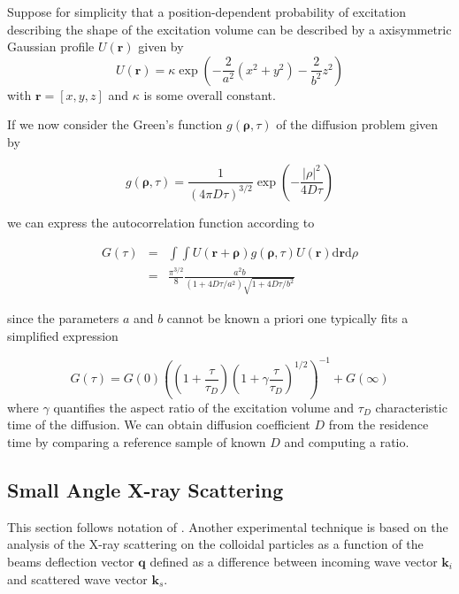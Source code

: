 \documentclass{doctoral}
\newcommand{\dd}{\mathrm{d}}
\begin{document}
Suppose for simplicity that a position-dependent probability of excitation describing the shape of the excitation volume can be described by a axisymmetric Gaussian profile $U(\mathbf{r})$ given by
\begin{equation}
    U(\mathbf{r}) = \kappa \exp\left( - \frac{2}{a^2} \left( x^2 + y^2 \right) - \frac{2}{b^2} z^2 \right) \label{eqn:excitation_profile}
\end{equation}
with $\mathbf{r} = [x,y,z]$ and $\kappa$ is some overall constant.

If we now consider the Green's function $g(\mathbf{\rho},\tau)$ of the diffusion problem given by 

\begin{equation}
    g(\mathbf{\rho},\tau) = \frac{1}{(4\pi D \tau)^{3/2}} \exp\left( - \frac{|\rho|^2}{4 D \tau}\right)
\end{equation}

we can express the autocorrelation function according to 

\begin{eqnarray}
    G(\tau) & = & \int \int U(\mathbf{r} + \mathbf{\rho}) g(\mathbf{\rho},\tau) U(\mathbf{r}) \dd \mathbf{r} \dd \rho \\
            & = & \frac{\pi^{3/2}}{8} \frac{a^2 b}{(1+4 D \tau / a^2)\sqrt{1+4D\tau/b^2}} \label{eqn:fcs_theory}
\end{eqnarray}

since the parameters $a$ and $b$ cannot be known a priori one typically fits a simplified expression 

\begin{equation}
    G(\tau) = G(0) \left( \left(1+\frac{\tau}{\tau_D}\right) \left(1 + \gamma \frac{\tau}{\tau_D}\right)^{1/2} \right)^{-1} + G(\infty) \label{eqn:fcs-autocorrelation}
\end{equation}
where $\gamma$ quantifies the aspect ratio of the excitation volume and $\tau_D$ characteristic time of the diffusion.
We can obtain diffusion coefficient $D$ from the residence time by comparing a reference sample of known $D$ and computing a ratio.

\subsection{Small Angle X-ray Scattering}
\label{sec:SAXS}

This section follows notation of \cite{Hermann_2008}.
Another experimental technique is based on the analysis of the X-ray scattering on the colloidal particles as a function of the beams deflection vector $\mathbf{q}$ defined as a difference between incoming wave vector $\mathbf{k}_i$ and scattered wave vector $\mathbf{k}_s$.
\end{document}
